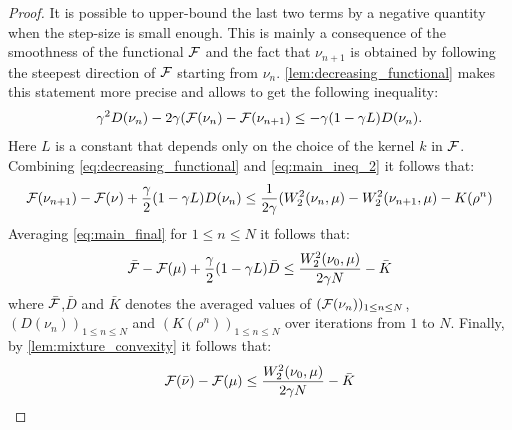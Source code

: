 \begin{proof}
It is possible to upper-bound the last two terms by a negative quantity when the step-size is small enough. This is mainly a consequence of the smoothness of the functional ${{\mathcal F}}$ and the fact that $\nu_{n+1}$ is obtained by following the steepest direction of ${{\mathcal F}}$ starting from $\nu_n$. \cref{lem:decreasing_functional} makes this statement more precise and allows to get the following inequality:
\begin{align}
	\gamma^2 D(\nu_n) -2\gamma ({{\mathcal F}}(\nu_n)-{{\mathcal F}}(\nu_{n+1})\leq -\gamma (1-\gamma L)D(\nu_n).
	\label{eq:decreasing_functional}
\end{align}
Here $L$ is a constant that depends only on the choice of the kernel $k$ in ${{\mathcal F}}$. Combining \cref{eq:decreasing_functional} and \cref{eq:main_ineq_2} it follows that:
\begin{align}
{{\mathcal F}}(\nu_{n+1})-{{\mathcal F}}(\nu)+\frac{\gamma}{2}(1-\gamma L)D(\nu_n)
\leq 
\frac{1}{2\gamma} (W_2^2(\nu_n,\mu)-W_2^2(\nu_{n+1},\mu)-K(\rho^n)
\label{eq:main_final}
\end{align}
Averaging \cref{eq:main_final} for $1\leq n\leq N$ it follows that:
\begin{align}
	\bar{{{\mathcal F}}}-{{\mathcal F}}(\mu)+\frac{\gamma}{2}(1-\gamma L)\bar{D} \leq \frac{W_2^2(\nu_0,\mu)}{2 \gamma N} -\bar{K}
\end{align}
where $\bar{{{\mathcal F}}}$,$\bar{D}$ and $\bar{K}$ denotes the averaged values of $({{\mathcal F}}(\nu_n))_{1\leq n \leq N}$, $(D(\nu_n))_{1\leq n \leq N}$  and $(K(\rho^n))_{1\leq n \leq N}$ over iterations from $1$ to $N$. Finally, by \cref{lem:mixture_convexity} it follows that:
\begin{align}
{{\mathcal F}}(\bar{\nu})-{{\mathcal F}}(\mu)\leq  \frac{W_2^2(\nu_0,\mu)}{2 \gamma N} -\bar{K}
\end{align}

\end{proof}




